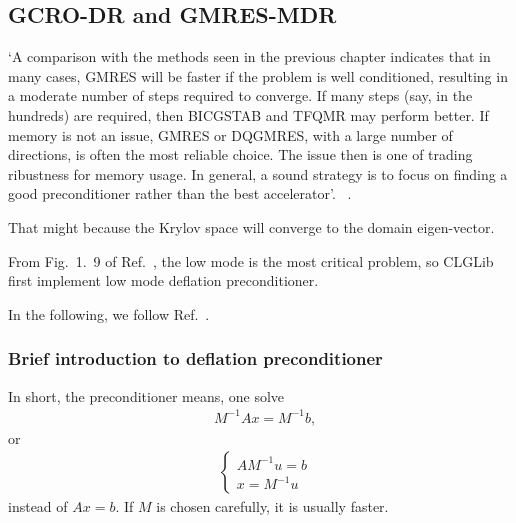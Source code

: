 \subsection{\label{sec:GCRODR} GCRO-DR and GMRES-MDR}

`A comparison with the methods seen in the previous chapter indicates that in many cases, GMRES will be faster if the problem is well conditioned, resulting in a moderate number of steps required to converge. If many steps (say, in the hundreds) are required, then BICGSTAB and TFQMR may perform better. If memory is not an issue, GMRES or DQGMRES, with a large number of directions, is often the most reliable choice. The issue then is one of trading ribustness for memory usage. In general, a sound strategy is to focus on finding a good preconditioner rather than the best accelerator'. ~\cite{sparselinearbook1}.

That might because the Krylov space will converge to the domain eigen-vector.

From Fig.~1.~9 of Ref.~\cite{luscher2010}, the low mode is the most critical problem, so CLGLib first implement low mode deflation preconditioner.

In the following, we follow Ref.~\cite{deflation}.

\subsubsection{\label{sec:preconditioner}Brief introduction to deflation preconditioner}

In short, the preconditioner means, one solve
\begin{equation}
\begin{split}
&M^{-1}Ax=M^{-1}b,
\end{split}
\end{equation}
or
\begin{equation}
\begin{split}
&\left\{\begin{array}{c} AM^{-1}u=b\\ x=M^{-1}u\end{array}\right.
\end{split}
\end{equation}
instead of $Ax=b$. If $M$ is chosen carefully, it is usually faster.

